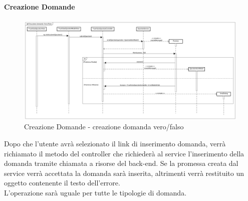 \paragraph{Creazione Domande}

\label{Creazione Domande - creazione domanda vero/falso}

\begin{figure}[ht]
	\centering
	\includegraphics[scale=0.25,keepaspectratio]{UML/DiagrammiDiSequenza/Front-end/TrueFalseQuestionCreation.png}
	\caption{Creazione Domande - creazione domanda vero/falso}
\end{figure} \FloatBarrier

Dopo che l'utente avrà selezionato il link di inserimento domanda, verrà richiamato il metodo del controller che richiederà al service l'inserimento della domanda tramite chiamata a risorse del back-end. Se la promessa creata dal service verrà accettata la domanda sarà inserita, altrimenti verrà restituito un oggetto contenente il testo dell'errore. \\ L'operazione sarà uguale per tutte le tipologie di domanda. 